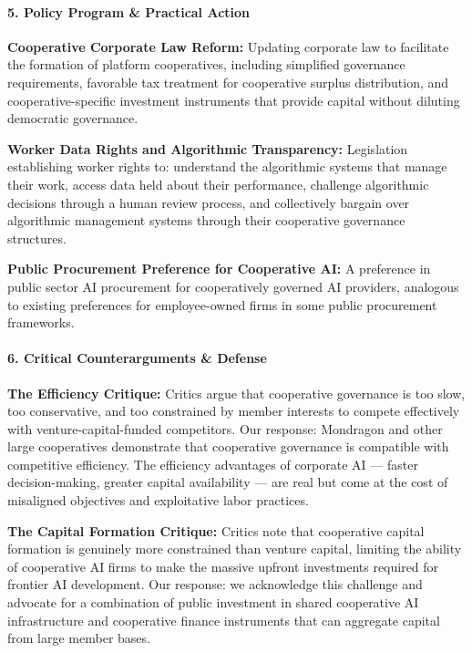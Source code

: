 \paragraph{5. Policy Program \& Practical
Action}\label{policy-program-practical-action-30}

\textbf{Cooperative Corporate Law Reform:} Updating corporate law to
facilitate the formation of platform cooperatives, including simplified
governance requirements, favorable tax treatment for cooperative surplus
distribution, and cooperative-specific investment instruments that
provide capital without diluting democratic governance.

\textbf{Worker Data Rights and Algorithmic Transparency:} Legislation
establishing worker rights to: understand the algorithmic systems that
manage their work, access data held about their performance, challenge
algorithmic decisions through a human review process, and collectively
bargain over algorithmic management systems through their cooperative
governance structures.

\textbf{Public Procurement Preference for Cooperative AI:} A preference
in public sector AI procurement for cooperatively governed AI providers,
analogous to existing preferences for employee-owned firms in some
public procurement frameworks.

\paragraph{6. Critical Counterarguments \&
Defense}\label{critical-counterarguments-defense-30}

\textbf{The Efficiency Critique:} Critics argue that cooperative
governance is too slow, too conservative, and too constrained by member
interests to compete effectively with venture-capital-funded
competitors. Our response: Mondragon and other large cooperatives
demonstrate that cooperative governance is compatible with competitive
efficiency. The efficiency advantages of corporate AI --- faster
decision-making, greater capital availability --- are real but come at
the cost of misaligned objectives and exploitative labor practices.

\textbf{The Capital Formation Critique:} Critics note that cooperative
capital formation is genuinely more constrained than venture capital,
limiting the ability of cooperative AI firms to make the massive upfront
investments required for frontier AI development. Our response: we
acknowledge this challenge and advocate for a combination of public
investment in shared cooperative AI infrastructure and cooperative
finance instruments that can aggregate capital from large member bases.

